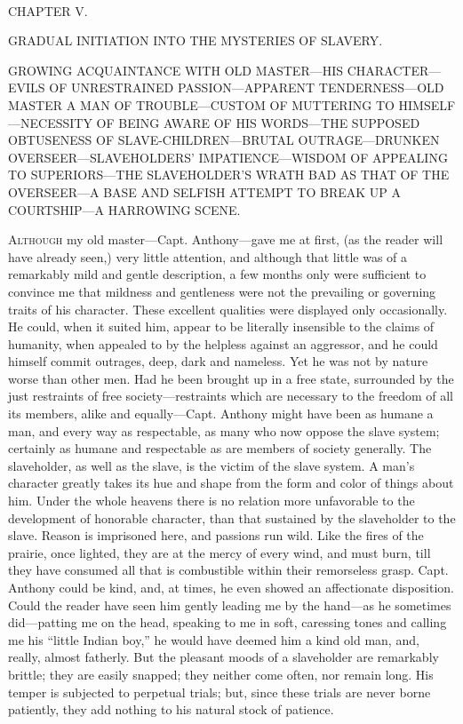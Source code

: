 {\protect\hypertarget{79}{}{}}

~

{CHAPTER V.}

GRADUAL INITIATION INTO THE MYSTERIES OF SLAVERY.

{GROWING ACQUAINTANCE WITH OLD MASTER---HIS CHARACTER---EVILS OF
UNRESTRAINED PASSION---APPARENT TENDERNESS---OLD MASTER A MAN OF
TROUBLE---CUSTOM OF MUTTERING TO HIMSELF---NECESSITY OF BEING AWARE OF
HIS WORDS---THE SUPPOSED OBTUSENESS OF SLAVE-CHILDREN---BRUTAL
OUTRAGE---DRUNKEN OVERSEER---SLAVEHOLDERS' IMPATIENCE---WISDOM OF
APPEALING TO SUPERIORS---THE SLAVEHOLDER'S WRATH BAD AS THAT OF THE
OVERSEER---A BASE AND SELFISH ATTEMPT TO BREAK UP A COURTSHIP---A
HARROWING SCENE.}

\textsc{Although} my old master---Capt. Anthony---gave me at first, (as
the reader will have already seen,) very little attention, and although
that little was of a remarkably mild and gentle description, a few
months only were sufficient to convince me that mildness and gentleness
were not the prevailing or governing traits of his character. These
excellent qualities were displayed only occasionally. He could, when it
suited him, appear to be literally insensible to the claims of humanity,
when appealed to by the helpless against an aggressor, and he could
himself commit outrages, deep, dark and nameless. Yet he was not by
nature worse than other men. Had he been brought up in a free state,
surrounded by the just restraints of free society---restraints which are
necessary to the freedom of all its members, alike and equally---Capt.
Anthony might have been as {\protect\hypertarget{80}{}{}}humane a man,
and every way as respectable, as many who now oppose the slave system;
certainly as humane and respectable as are members of society generally.
The slaveholder, as well as the slave, is the victim of the slave
system. A man's character greatly takes its hue and shape from the form
and color of things about him. Under the whole heavens there is no
relation more unfavorable to the development of honorable character,
than that sustained by the slaveholder to the slave. Reason is
imprisoned here, and passions run wild. Like the fires of the prairie,
once lighted, they are at the mercy of every wind, and must burn, till
they have consumed all that is combustible within their remorseless
grasp. Capt. Anthony could be kind, and, at times, he even showed an
affectionate disposition. Could the reader have seen him gently leading
me by the hand---as he sometimes did---patting me on the head, speaking
to me in soft, caressing tones and calling me his ``little Indian boy,''
he would have deemed him a kind old man, and, really, almost fatherly.
But the pleasant moods of a slaveholder are remarkably brittle; they are
easily snapped; they neither come often, nor remain long. His temper is
subjected to perpetual trials; but, since these trials are never borne
patiently, they add nothing to his natural stock of patience.


